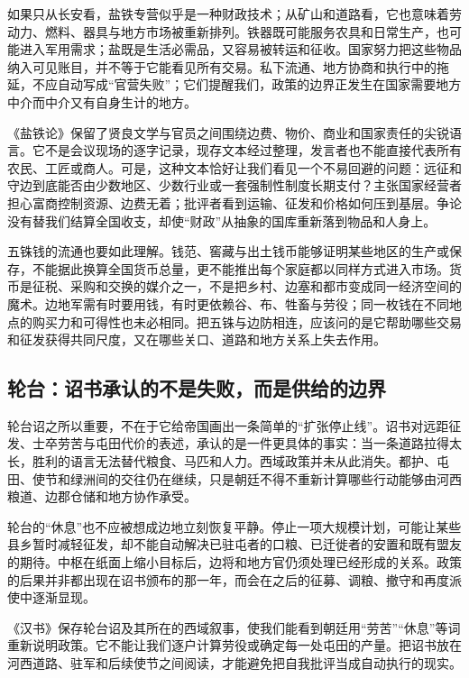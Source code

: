 如果只从长安看，盐铁专营似乎是一种财政技术；从矿山和道路看，它也意味着劳动力、燃料、器具与地方市场被重新排列。铁器既可能服务农具和日常生产，也可能进入军用需求；盐既是生活必需品，又容易被转运和征收。国家努力把这些物品纳入可见账目，并不等于它能看见所有交易。私下流通、地方协商和执行中的拖延，不应自动写成“官营失败”；它们提醒我们，政策的边界正发生在国家需要地方中介而中介又有自身生计的地方。

《盐铁论》保留了贤良文学与官员之间围绕边费、物价、商业和国家责任的尖锐语言。它不是会议现场的逐字记录，现存文本经过整理，发言者也不能直接代表所有农民、工匠或商人。可是，这种文本恰好让我们看见一个不易回避的问题：远征和守边到底能否由少数地区、少数行业或一套强制性制度长期支付？主张国家经营者担心富商控制资源、边费无着；批评者看到运输、征发和价格如何压到基层。争论没有替我们结算全国收支，却使“财政”从抽象的国库重新落到物品和人身上。

五铢钱的流通也要如此理解。钱范、窖藏与出土钱币能够证明某些地区的生产或保存，不能据此换算全国货币总量，更不能推出每个家庭都以同样方式进入市场。货币是征税、采购和交换的媒介之一，不是把乡村、边塞和都市变成同一经济空间的魔术。边地军需有时要用钱，有时更依赖谷、布、牲畜与劳役；同一枚钱在不同地点的购买力和可得性也未必相同。把五铢与边防相连，应该问的是它帮助哪些交易和征发获得共同尺度，又在哪些关口、道路和地方关系上失去作用。

\subsection{轮台：诏书承认的不是失败，而是供给的边界}

轮台诏之所以重要，不在于它给帝国画出一条简单的“扩张停止线”。诏书对远距征发、士卒劳苦与屯田代价的表述，承认的是一件更具体的事实：当一条道路拉得太长，胜利的语言无法替代粮食、马匹和人力。西域政策并未从此消失。都护、屯田、使节和绿洲间的交往仍在继续，只是朝廷不得不重新计算哪些行动能够由河西粮道、边郡仓储和地方协作承受。

轮台的“休息”也不应被想成边地立刻恢复平静。停止一项大规模计划，可能让某些县乡暂时减轻征发，却不能自动解决已驻屯者的口粮、已迁徙者的安置和既有盟友的期待。中枢在纸面上缩小目标后，边将和地方官仍须处理已经形成的关系。政策的后果并非都出现在诏书颁布的那一年，而会在之后的征募、调粮、撤守和再度派使中逐渐显现。

\begin{textwindow}[轮台诏把什么带进读者视野]
《汉书》保存轮台诏及其所在的西域叙事，使我们能看到朝廷用“劳苦”“休息”等词重新说明政策。它不能让我们逐户计算劳役或确定每一处屯田的产量。把诏书放在河西道路、驻军和后续使节之间阅读，才能避免把自我批评当成自动执行的现实。
\end{textwindow}

